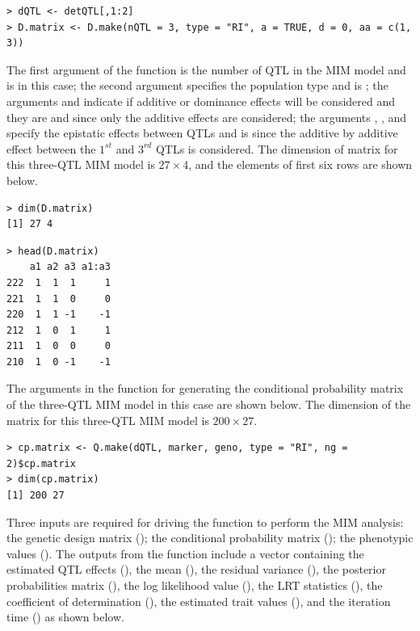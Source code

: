 \begin{verbatim}
> dQTL <- detQTL[,1:2]
> D.matrix <- D.make(nQTL = 3, type = "RI", a = TRUE, d = 0, aa = c(1, 3))
\end{verbatim}

\noindent The first argument of the  function is the number of QTL in the MIM model and is  in this case; the second argument specifies the population type and is ; the arguments  and  indicate if additive or dominance effects will be considered and they are  and  since only the additive effects are considered; the arguments , , and  specify the epistatic effects between QTLs and is  since the additive by additive effect between the $1^{st}$ and $3^{rd}$ QTLs is considered. The dimension of  matrix for this three-QTL MIM model is $27\times 4$, and the elements of first six rows are shown below.

\begin{verbatim}
> dim(D.matrix)
[1] 27 4
\end{verbatim}

\begin{verbatim}
> head(D.matrix)
    a1 a2 a3 a1:a3
222  1  1  1     1
221  1  1  0     0
220  1  1 -1    -1
212  1  0  1     1
211  1  0  0     0
210  1  0 -1    -1
\end{verbatim}

\noindent The arguments in the  function for generating the conditional probability matrix of the three-QTL MIM model in this case are shown below. The dimension of the  matrix for this three-QTL MIM model is $200\times 27$.

\begin{verbatim}
> cp.matrix <- Q.make(dQTL, marker, geno, type = "RI", ng = 2)$cp.matrix
> dim(cp.matrix)
[1] 200 27
\end{verbatim}

Three inputs are required for driving the  function to perform the MIM analysis: the genetic design matrix (); the conditional probability matrix (); the phenotypic values (). The outputs from the  function include a vector containing the estimated QTL effects (), the mean (), the residual variance (), the posterior probabilities matrix (), the log likelihood value (), the LRT statistics (), the coefficient of determination (), the estimated trait values (), and the iteration time () as shown below.


